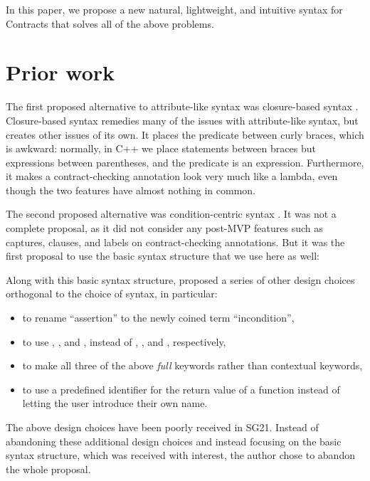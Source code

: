In this paper, we propose a new natural, lightweight, and intuitive syntax for Contracts that solves all of the above problems.
 

\section{Prior work}

The first proposed alternative to attribute-like syntax was closure-based syntax \cite{P2461R1}. Closure-based syntax remedies many of the issues with attribute-like syntax, but creates other issues of its own. It places the predicate between curly braces, which is awkward: normally, in C++ we place statements between braces but expressions between parentheses, and the predicate is an expression. Furthermore, it makes a contract-checking annotation look very much like a lambda, even though the two features have almost nothing in common.

The second proposed alternative was condition-centric syntax \cite{P2737R0}. It was not a complete proposal, as it did not consider any post-MVP features such as captures,  clauses, and labels on contract-checking annotations. But it was the first proposal to use the basic syntax structure that we use here as well:

\phantom{~~~}

Along with this basic syntax structure, \cite{P2737R0} proposed a series of other design choices orthogonal to the choice of syntax, in particular:

\begin{itemize}
\item to rename ``assertion'' to the newly coined term ``incondition'',
\item to use , , and , instead of , , and , respectively,
\item to make all three of the above \emph{full} keywords rather than contextual keywords,
\item to use a predefined identifier  for the return value of a function instead of letting the user introduce their own name.
\end{itemize}

The above design choices have been poorly received in SG21. Instead of abandoning these additional design choices and instead focusing on the basic syntax structure, which was received with interest, the author chose to abandon the whole proposal.


